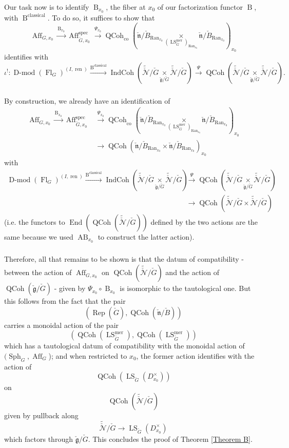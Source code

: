 \documentclass[10pt,a4paper]{amsart}
\newcommand{\on}[1]{\operatorname{#1}}
\newcommand{\Dmod}{\on{D-mod}}
\newcommand{\QCoh}{\on{QCoh}}
\newcommand{\IndCoh}{\on{IndCoh}}
\newcommand{\Gcheck}{\check{G}}
\newcommand{\gcheck}{\check{\mathfrak{g}}}
\newcommand{\ncheck}{\check{\mathfrak{n}}}
\newcommand{\Bcheck}{\check{B}}
\newcommand{\Ran}{\on{Ran}}
\newcommand{\sssec}[1]{\subsubsection{}}
\begin{document}
\sssec{}
Our task now is to identify $\on{B}_{x_0}$, the fiber at $x_0$ of our factorization functor $\on{B}$, with $\on{B}^{\on{classical}}$. To do so, it suffices to show that 
$$
\on{Aff}_{G, x_0} \overset{\on{B}_{x_0}}{\longrightarrow} \on{Aff}_{\Gcheck, x_0}^{\on{spec}} \overset{\Psi_{x_0}}{\longrightarrow} \QCoh_{\on{co}}(\ncheck/\Bcheck_{\Ran_{x_0}} \underset{(\on{LS}_{\Gcheck}^{\on{mer}})_{\Ran_{x_0}}}{\times} \ncheck/\Bcheck_{\Ran_{x_0}})_{x_0}
$$
identifies with
$$
\iota^!: \Dmod(\on{Fl}_{G})^{(I, \on{ren})} \overset{\on{B}^{\on{classical}}}{\longrightarrow} \IndCoh(\tilde{\check{\mathcal{N}}}/\Gcheck \underset{\gcheck/\Gcheck}{\times} \tilde{\check{\mathcal{N}}}/\Gcheck) \overset{\Psi}{\longrightarrow} \QCoh(\tilde{\check{\mathcal{N}}}/\Gcheck \underset{\gcheck/\Gcheck}{\times} \tilde{\check{\mathcal{N}}}/\Gcheck).
$$

\sssec{}
By construction, we already have an identification of
\begin{align}
\on{Aff}_{G, x_0} \overset{\on{B}_{x_0}}{\longrightarrow} \on{Aff}_{\Gcheck, x_0}^{\on{spec}} &\overset{\Psi_{x_0}}{\longrightarrow} \QCoh_{\on{co}}(\ncheck/\Bcheck_{\Ran_{x_0}} \underset{(\on{LS}_{\Gcheck}^{\on{mer}})_{\Ran_{x_0}}}{\times} \ncheck/\Bcheck_{\Ran_{x_0}})_{x_0} \\ &\longrightarrow \on{QCoh}(\ncheck/\Bcheck_{\Ran_{x_0}} \times \ncheck/\Bcheck_{\Ran_{x_0}})_{x_0}
\end{align}
with
\begin{align}
    \Dmod(\on{Fl}_{G})^{(I, \on{ren})} \overset{\on{B}^{\on{classical}}}{\longrightarrow} \IndCoh(\tilde{\check{\mathcal{N}}}/\Gcheck \underset{\gcheck/\Gcheck}{\times} \tilde{\check{\mathcal{N}}}/\Gcheck) &\overset{\Psi}{\longrightarrow} \QCoh(\tilde{\check{\mathcal{N}}}/\Gcheck \underset{\gcheck/\Gcheck}{\times} \tilde{\check{\mathcal{N}}}/\Gcheck) \\ &\longrightarrow \on{QCoh}(\tilde{\check{\mathcal{N}}}/\Gcheck \times \tilde{\check{\mathcal{N}}}/\Gcheck)
\end{align}
(i.e. the functors to $\on{End}(\on{QCoh}(\tilde{\check{\mathcal{N}}}/\Gcheck))$ defined by the two actions are the same because we used $\on{AB}_{x_0}$ to construct the latter action).

\sssec{}
Therefore, all that remains to be shown is that the datum of compatibility - between the action of $\on{Aff}_{G, x_0}$ on $\on{QCoh}(\tilde{\check{\mathcal{N}}}/\Gcheck)$ and the action of $\QCoh(\gcheck/\Gcheck)$ - given by $\Psi_{x_0} \circ \on{B}_{x_0}$ is isomorphic to the tautological one. But this follows from the fact that the pair
$$
(\on{Rep}(\Gcheck), \QCoh(\ncheck/\Bcheck))
$$
carries a monoidal action of the pair
$$
(\QCoh(\on{LS}_{\Gcheck}^{\on{mer}}), \QCoh(\on{LS}_{\Gcheck}^{\on{mer}}))
$$
which has a tautological datum of compatibility with the monoidal action of $(\on{Sph}_G, \on{Aff}_{G}$); and when restricted to $x_0$, the former action identifies with the action of
$$
\QCoh(\on{LS}_{\Gcheck}(D_{x_0}^{\times}))
$$
on
$$
\QCoh(\tilde{\check{\mathcal{N}}}/\Gcheck)
$$
given by pullback along
$$
\tilde{\check{\mathcal{N}}}/\Gcheck \longrightarrow\on{LS}_{\Gcheck}(D_{x_0}^{\times})
$$
which factors through $\gcheck/\Gcheck$. This concludes the proof of Theorem \ref{Theorem B}.
\end{document}
